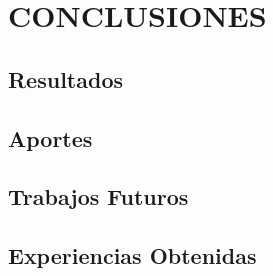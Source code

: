\section{CONCLUSIONES}

\subsection{Resultados}
\subsection{Aportes} %
\subsection{Trabajos Futuros}
\subsection{Experiencias Obtenidas}
